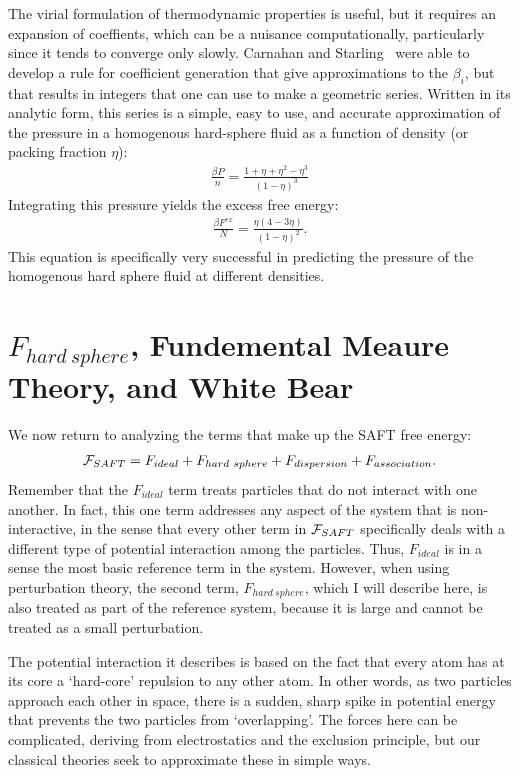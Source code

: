 The virial formulation of thermodynamic properties is useful, but it
requires an expansion of coeffients, which can be a nuisance
computationally, particularly since it tends to converge only slowly.
Carnahan and
Starling~\cite{carnahan1969equation,mansoori1971equilibrium} were able
to develop a rule for coefficient generation that give approximations
to the $\beta_i$, but that results in integers that one can use to
make a geometric series.  Written in its analytic form, this series is
a simple, easy to use, and accurate approximation of the pressure in a
homogenous hard-sphere fluid as a function of density (or packing
fraction $\eta$):
\begin{align}
  \frac{\beta P}{n}=\frac{1+\eta+\eta^2-\eta^3}{(1-\eta)^3}
\end{align}
Integrating this pressure yields the excess free energy:
\begin{align}
  \frac{\beta F^{ex}}{N}=\frac{\eta(4-3\eta)}{(1-\eta)^2}.
\end{align}
This equation is specifically very successful in predicting the
pressure of the homogenous hard sphere fluid at different densities.

\section{$F_{hard~sphere}$, Fundemental Meaure Theory, and White Bear}
\label{sec:hard-sphere}

We now return to analyzing the terms that make up the SAFT free energy:
\begin{align}
  \mathcal{F}_{SAFT} = F_{ideal} + F_{hard~sphere} +  F_{dispersion} + F_{association}.
\end{align}
Remember that the $F_{ideal}$ term treats particles that do not
interact with one another.  In fact, this one term addresses any
aspect of the system that is non-interactive, in the sense that every
other term in $\mathcal{F}_{SAFT}$ specifically deals with a different type of
potential interaction among the particles.  Thus, $F_{ideal}$ is in a
sense the most basic reference term in the system.  However, when
using perturbation theory, the second term, $F_{hard~sphere}$, which I
will describe here, is also treated as part of the reference system,
because it is large and cannot be treated as a small perturbation.

The potential interaction it describes is based on the fact that every
atom has at its core a `hard-core' repulsion to any other atom.  In
other words, as two particles approach each other in space, there is a
sudden, sharp spike in potential energy that prevents the two
particles from `overlapping'.  The forces here can be complicated,
deriving from electrostatics and the exclusion principle, but our
classical theories seek to approximate these in simple ways.

